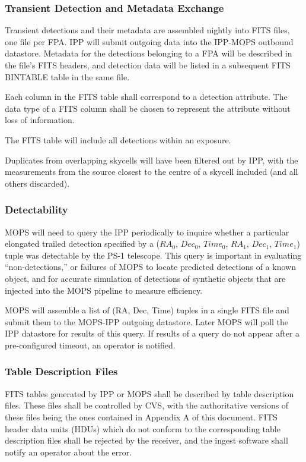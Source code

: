\documentclass[panstarrs,spec]{panstarrs}
\begin{document}
\subsubsection{Transient Detection and Metadata Exchange}

Transient detections and their metadata are assembled nightly into
FITS files, one file per FPA.  IPP will submit outgoing data into the
IPP-MOPS outbound datastore.  Metadata for the detections belonging to
a FPA will be described in the file's FITS headers, and detection data
will be listed in a subsequent FITS BINTABLE table in the same file.

Each column in the FITS table shall correspond to a detection attribute.
The data type of a FITS column shall be chosen to represent the attribute
without loss of information.

The FITS table will include all detections within an exposure.

Duplicates from overlapping skycells will have been filtered out by
IPP, with the measurements from the source closest to the centre of a
skycell included (and all others discarded).

\subsubsection{Detectability}

MOPS will need to query the IPP periodically to inquire whether a
particular elongated trailed detection specified by a ($RA_0$,
$Dec_0$, $Time_0$, $RA_1$, $Dec_1$, $Time_1$) tuple was detectable by
the PS-1 telescope.  This query is important in evaluating
``non-detections,'' or failures of MOPS to locate predicted detections
of a known object, and for accurate simulation of detections of
synthetic objects that are injected into the MOPS pipeline to measure
efficiency.

MOPS will assemble a list of (RA, Dec, Time) tuples in a single FITS
file and submit them to the MOPS-IPP outgoing datastore.  Later MOPS
will poll the IPP datastore for results of this query.  If results of
a query do not appear after a pre-configured timeout, an operator is
notified.

\subsubsection{Table Description Files}

FITS tables generated by IPP or MOPS shall be described by table
description files.  These files shall be controlled by CVS, with the
authoritative versions of these files being the ones contained in
Appendix A of this document. FITS header data units (HDUs) which do
not conform to the corresponding table description files shall be
rejected by the receiver, and the ingest software shall notify an
operator about the error.
\end{document}
